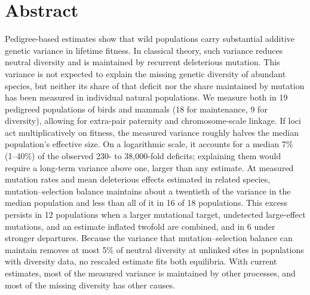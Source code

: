 \documentclass{article}
\begin{document}
    \linenumbers
\fi

\section*{Abstract}
Pedigree-based estimates show that wild populations carry substantial additive genetic variance in lifetime fitness. In classical theory, such variance reduces neutral diversity and is maintained by recurrent deleterious mutation. This variance is not expected to explain the missing genetic diversity of abundant species, but neither its share of that deficit nor the share maintained by mutation has been measured in individual natural populations. We measure both in 19 pedigreed populations of birds and mammals (18 for maintenance, 9 for diversity), allowing for extra-pair paternity and chromosome-scale linkage. If loci act multiplicatively on fitness, the measured variance roughly halves the median population's effective size. On a logarithmic scale, it accounts for a median 7\% (1--40\%) of the observed 230- to 38,000-fold deficits; explaining them would require a long-term variance above one, larger than any estimate. At measured mutation rates and mean deleterious effects estimated in related species, mutation--selection balance maintains about a twentieth of the variance in the median population and less than all of it in 16 of 18 populations. This excess persists in 12 populations when a larger mutational target, undetected large-effect mutations, and an estimate inflated twofold are combined, and in 6 under stronger departures. Because the variance that mutation--selection balance can maintain removes at most 5\% of neutral diversity at unlinked sites in populations with diversity data, no rescaled estimate fits both equilibria. With current estimates, most of the measured variance is maintained by other processes, and most of the missing diversity has other causes.

\ifdefined\isMainDocument
\else
    \printbibliography
    
\end{document}
